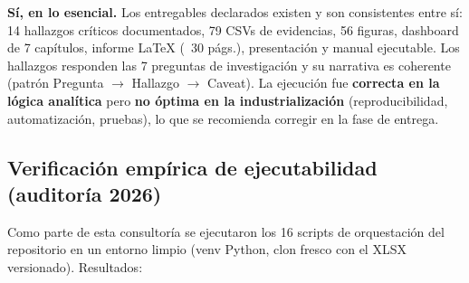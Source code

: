 \begin{tcolorbox}[hallazgo]
\textbf{Sí, en lo esencial.} Los entregables declarados existen y son
consistentes entre sí: 14 hallazgos críticos documentados, 79 CSVs de evidencias,
56 figuras, dashboard de 7 capítulos, informe LaTeX (~30 págs.), presentación y
manual ejecutable. Los hallazgos responden las 7 preguntas de investigación y su
narrativa es coherente (patrón Pregunta $\rightarrow$ Hallazgo $\rightarrow$ Caveat).
La ejecución fue \textbf{correcta en la lógica analítica} pero \textbf{no óptima
en la industrialización} (reproducibilidad, automatización, pruebas), lo que se
recomienda corregir en la fase de entrega.
\end{tcolorbox}

\subsection{Verificación empírica de ejecutabilidad (auditoría 2026)}

Como parte de esta consultoría se ejecutaron los 16 scripts de orquestación
del repositorio en un entorno limpio (venv Python, clon fresco con el XLSX
versionado). Resultados:

